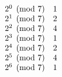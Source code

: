 \setcounter{enumi}{4}
\setcounter{enumii}{0}

\item 
\(
\begin{array}[t]{ll}
2^0 \pmod 7 & 1 \\
2^1 \pmod 7 & 2 \\
2^2 \pmod 7 & 4 \\
2^3 \pmod 7 & 1 \\
2^4 \pmod 7 & 2 \\
2^5 \pmod 7 & 4 \\
2^6 \pmod 7 & 1 \\

\end{array}
\)


